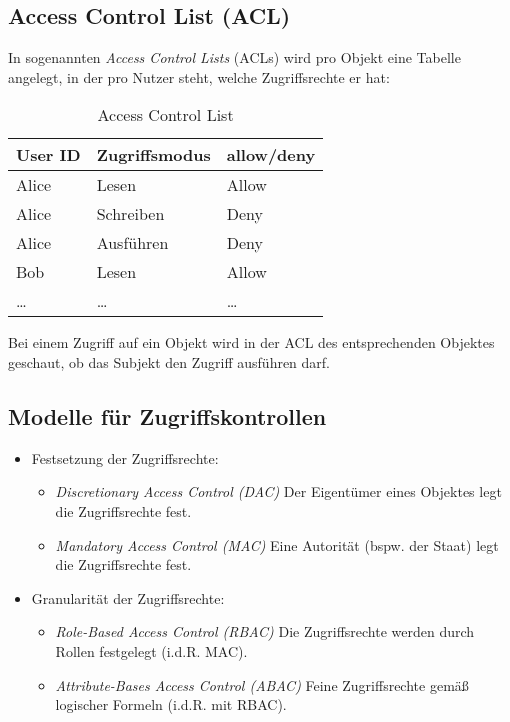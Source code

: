         \subsection{Access Control List (ACL)}
            In sogenannten \textit{Access Control Lists} (ACLs) wird pro Objekt eine Tabelle angelegt, in der pro Nutzer steht, welche Zugriffsrechte er hat:
            \begin{table}[H]
            	\centering
            	\begin{tabular}{| l | l | l |}
            		\hline
            		\textbf{User ID} & \textbf{Zugriffsmodus} & \textbf{allow/deny} \\ \hline
            		Alice            & Lesen                  & Allow               \\
            		Alice            & Schreiben              & Deny                \\
            		Alice            & Ausführen              & Deny                \\
            		Bob              & Lesen                  & Allow               \\
            		\dots            & \dots                  & \dots               \\ \hline
            	\end{tabular}
            	\caption{Access Control List}
            \end{table}
            Bei einem Zugriff auf ein Objekt wird in der ACL des entsprechenden Objektes geschaut, ob das Subjekt den Zugriff ausführen darf.

        \subsection{Modelle für Zugriffskontrollen}
            \begin{itemize}
            	\item Festsetzung der Zugriffsrechte:
                	\begin{itemize}
	                	\item \textit{Discretionary Access Control (DAC)}    \tabto{4cm} Der Eigentümer eines Objektes legt die Zugriffsrechte fest.
	                	\item \textit{Mandatory Access Control (MAC)}        \tabto{4cm} Eine Autorität (bspw. der Staat) legt die Zugriffsrechte fest.
	                \end{itemize}
                \item Granularität der Zugriffsrechte:
	                \begin{itemize}
	                	\item \textit{Role-Based Access Control (RBAC)}      \tabto{4cm} Die Zugriffsrechte werden durch Rollen festgelegt (i.d.R. MAC).
	                	\item \textit{Attribute-Bases Access Control (ABAC)} \tabto{4cm} Feine Zugriffsrechte gemäß logischer Formeln (i.d.R. mit RBAC).
	                \end{itemize}
            \end{itemize}

